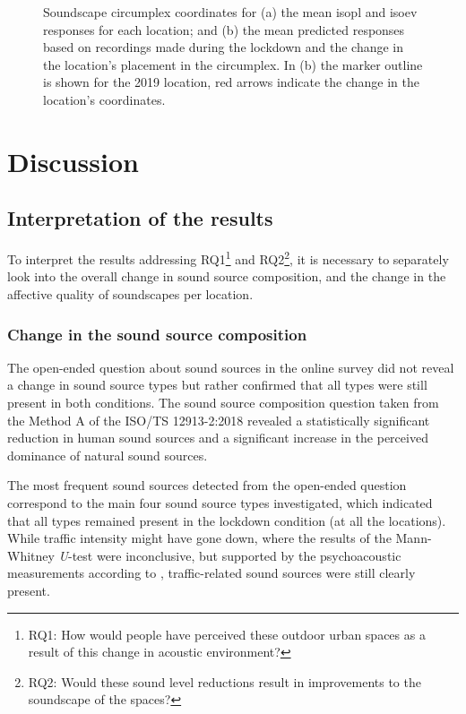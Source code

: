 \begin{figure}[!hp]
  \caption{Soundscape circumplex coordinates for (a) the mean \gls{isopl} and \gls{isoev} responses for each location; and (b) the mean predicted responses based on recordings made during the lockdown and the change in the location's placement in the circumplex. In (b) the marker outline is shown for the 2019 location, red arrows indicate the change in the location's coordinates. \label{fig:circumplex-locations}}
  
\end{figure}


\section{Discussion}
\label{sec:lockdownDiscussion}
 \subsection{Interpretation of the results}

   To interpret the results addressing RQ1\footnote{RQ1: How would people have perceived these outdoor urban spaces as a result of this change in acoustic environment?} and RQ2\footnote{RQ2: Would these sound level reductions result in improvements to the soundscape of the spaces?}, it is necessary to separately look into the overall change in sound source composition, and the change in the affective quality of soundscapes per location.

   \subsubsection{Change in the sound source composition}

   The open-ended question about sound sources in the online survey did not reveal a change in sound source types but rather confirmed that all types were still present in both conditions. The sound source composition question taken from the Method A of the ISO/TS 12913-2:2018 \citep{ISO12913Part2} revealed a statistically significant reduction in human sound sources and a significant increase in the perceived dominance of natural sound sources.

   The most frequent sound sources detected from the open-ended question correspond to the main four sound source types investigated, which indicated that all types remained present in the lockdown condition (at all the locations). While traffic intensity might have gone down, where the results of the Mann-Whitney \emph{U}-test were inconclusive, but supported by the psychoacoustic measurements according to \citet{Aletta2020Assessing}, traffic-related sound sources were still clearly present.

